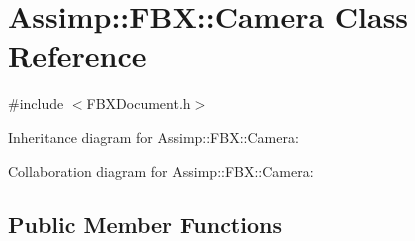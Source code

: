 \hypertarget{class_assimp_1_1_f_b_x_1_1_camera}{\section{Assimp\+:\+:F\+B\+X\+:\+:Camera Class Reference}
\label{class_assimp_1_1_f_b_x_1_1_camera}
}


{\ttfamily \#include $<$F\+B\+X\+Document.\+h$>$}



Inheritance diagram for Assimp\+:\+:F\+B\+X\+:\+:Camera\+:


Collaboration diagram for Assimp\+:\+:F\+B\+X\+:\+:Camera\+:
\subsection*{Public Member Functions}

